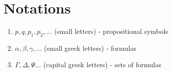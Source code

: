 \chapter*{Notations}
\begin{enumerate}
\item $p,q, p_1,p_2,\dots$ (small letters) - propositional symbols
\item $\alpha, \beta, \gamma, \dots $ (small greek letters) - formulas
\item $\Gamma, \Delta, \Psi \dots$ (capital greek letters) - sets of formulas
\end{enumerate}
